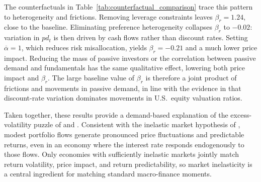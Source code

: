 \documentclass[12pt,english]{article}
\begin{document}
The counterfactuals in Table~\ref{tab:counterfactual_comparison} trace this pattern to heterogeneity and frictions.
Removing leverage constraints leaves $\beta_r = 1.24$, close to the baseline.
Eliminating preference heterogeneity collapses $\beta_r$ to $-0.02$: variation in $pd_t$ is then driven by cash flows rather than discount rates.
Setting $\overline{\alpha}=1$, which reduces risk misallocation, yields $\beta_r = -0.21$ and a much lower price impact.
Reducing the mass of passive investors or the correlation between passive demand and fundamentals has the same qualitative effect, lowering both price impact and $\beta_r$.
The large baseline value of $\beta_r$ is therefore a joint product of frictions and movements in passive demand, in line with the evidence in \citet{cochrane2011presidential} that discount-rate variation dominates movements in U.S.\ equity valuation ratios.

Taken together, these results provide a demand-based explanation of the excess-volatility puzzle of \citet{shiller1981} and \citet{leroy1981present}.
Consistent with the inelastic market hypothesis of \citet{gabaix2020search}, modest portfolio flows generate pronounced price fluctuations and predictable returns, even in an economy where the interest rate responds endogenously to those flows.
Only economies with sufficiently inelastic markets jointly match return volatility, price impact, and return predictability, so market inelasticity is a central ingredient for matching standard macro-finance moments.
\end{document}
